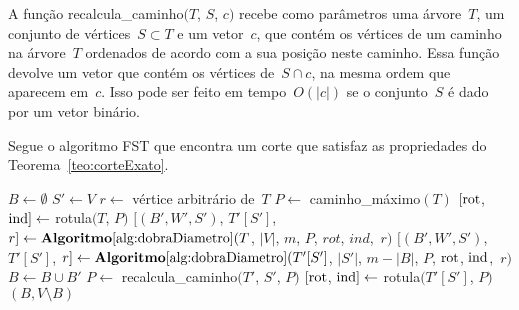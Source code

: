 		A função {\sc recalcula\_caminho}$(T$, $S$, $c)$
		recebe como parâmetros uma árvore~$T$, um conjunto de vértices~$S\subset T$ 
		e um vetor~$c$, que contém os vértices de um caminho na árvore~$T$ ordenados
		de acordo com a sua posição neste caminho.
		Essa função devolve um vetor que contém os vértices de~$S\cap c$, na mesma 
		ordem que aparecem em~$c$. 
		Isso pode ser feito em tempo~$O(|c|)$ se 
		o conjunto~$S$ é dado por um vetor binário.





		Segue o algoritmo FST que encontra um corte que satisfaz as 
		propriedades do Teorema~\ref{teo:corteExato}.
		
		\bigskip

		\begin{algorithm}[H]
		\label{alg:corteExato}

			\caption{}
			$B\gets \emptyset$\;
			$S'\gets V$\;
			$r\gets$ vértice arbitrário de~$T$\;
			$P\gets$ {\sc caminho\_máximo}$(T)$\;
			$[\mathrm{rot}$, $\mathrm{ind}]\gets$ {\sc rotula}$(T$, $P)$\;
			$[(B',W',S')$, $T'[S']$, $r]\gets
				\mathbf {Algoritmo\ref{alg:dobraDiametro}}(T$,
				$|V|$, $m$, $P$, $rot$, $ind$,~$r)$\;
			{
				$[(B',W',S')$, $T'[S']$, $r]\gets
					\mathbf {Algoritmo\ref{alg:dobraDiametro}}(T'[S']$,
					$|S'|$, $m-|B|$, $P$, $\mathrm{rot}$, $\mathrm{ind}$,~$r)$\;
				$B\gets B\cup B'$\;
				$P\gets$ {\sc recalcula\_caminho}$(T'$, $S'$, $P)$\;
				$[\mathrm{rot}$, $\mathrm{ind}]\gets$ {\sc rotula}$(T'[S']$, $P)$
			}
			\Return $(B,V\setminus B)$\;

		\end{algorithm}	

